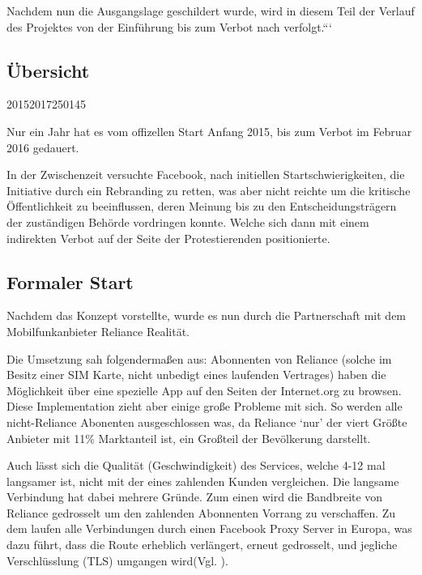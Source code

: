 \documentclass{article}
\begin{document}
Nachdem nun die Ausgangslage geschildert wurde, wird in diesem Teil der Verlauf des Projektes von der Einführung bis zum Verbot nach verfolgt.```

\subsection{Übersicht}

\begin{timeline}{2015}{2017}{250}{145}
\end{timeline}

Nur ein Jahr hat es vom offizellen Start Anfang 2015, bis zum Verbot im Februar 2016 gedauert.

In der Zwischenzeit versuchte Facebook, nach initiellen Startschwierigkeiten, die Initiative durch ein Rebranding zu retten, was aber nicht reichte um die kritische Öffentlichkeit zu beeinflussen, deren Meinung bis zu den Entscheidungsträgern der zuständigen Behörde vordringen konnte.
Welche sich dann mit einem indirekten Verbot auf der Seite der Protestierenden positionierte.

\subsection{Formaler Start}

Nachdem \textcite{HumanRight} das Konzept vorstellte, wurde es nun durch die Partnerschaft mit dem Mobilfunkanbieter Reliance Realität.

Die Umsetzung sah folgendermaßen aus: Abonnenten von Reliance (solche im Besitz einer SIM Karte, nicht unbedigt eines laufenden Vertrages) haben die Möglichkeit über eine spezielle App auf den Seiten der Internet.org zu browsen.
Diese Implementation zieht aber einige große Probleme mit sich. So werden alle nicht-Reliance Abonenten ausgeschlossen was, da Reliance `nur' der viert Größte Anbieter mit 11\% Marktanteil\autocite{mobileSubscribers} ist, ein Großteil der Bevölkerung darstellt.

Auch lässt sich die Qualität (Geschwindigkeit) des Services, welche 4-12 mal langsamer ist, nicht mit der eines zahlenden Kunden vergleichen.
Die langsame Verbindung hat dabei mehrere Gründe. Zum einen wird die Bandbreite von Reliance gedrosselt um den zahlenden Abonnenten Vorrang zu verschaffen. Zu dem laufen alle Verbindungen durch einen Facebook Proxy Server in Europa, was dazu führt, dass die Route erheblich verlängert, erneut gedrosselt, und jegliche Verschlüsslung (TLS) umgangen wird(Vgl. \cite{walledGarden}).
\end{document}
